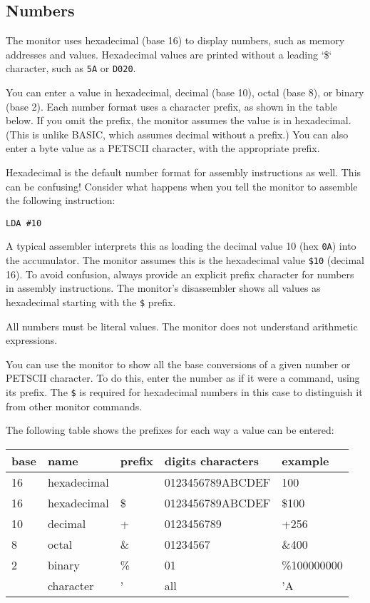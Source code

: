 \subsection{Numbers}

The monitor uses hexadecimal (base 16) to display numbers, such as memory addresses and values. Hexadecimal values are printed without a leading `\$` character, such as {\tt 5A} or {\tt D020}.

You can enter a value in hexadecimal, decimal (base 10), octal (base 8), or binary (base 2). Each number format uses a character prefix, as shown in the table below. If you omit the prefix, the monitor assumes the value is in hexadecimal. (This is unlike BASIC, which assumes decimal without a prefix.) You can also enter a byte value as a PETSCII character, with the appropriate prefix.

Hexadecimal is the default number format for assembly instructions as well. This can be confusing! Consider what happens when you tell the monitor to assemble the following instruction:

\begin{verbatim}
LDA #10
\end{verbatim}

A typical assembler interprets this as loading the decimal value 10 (hex {\tt 0A}) into the accumulator. The monitor assumes this is the hexadecimal value {\tt \$10} (decimal 16). To avoid confusion, always provide an explicit prefix character for numbers in assembly instructions. The monitor's disassembler shows all values as hexadecimal starting with the {\tt \$} prefix.

All numbers must be literal values. The monitor does not understand arithmetic expressions.

You can use the monitor to show all the base conversions of a given number or PETSCII character. To do this, enter the number as if it were a command, using its prefix. The {\tt \$} is required for hexadecimal numbers in this case to distinguish it from other monitor commands.

The following table shows the prefixes for each way a value can be entered:

{\ttfamily
{\setlength{\tabcolsep}{1mm}
\begin{center}
\begin{tabular}{|l|l|l|l|l|}
\hline
 base  & name & prefix & digits characters & example     \\
\hline
16 & hexadecimal  &     & 0123456789ABCDEF &   100       \\
16 & hexadecimal  & \$  & 0123456789ABCDEF & \$100       \\
10 & decimal      &  +  & 0123456789       & +256        \\
 8 & octal        & \&  & 01234567         & \&400       \\
 2 & binary       & \%  & 01               & \%100000000 \\
   & character    &  '  & all              & 'A          \\
\hline
\end{tabular}
\end{center}
}
}

